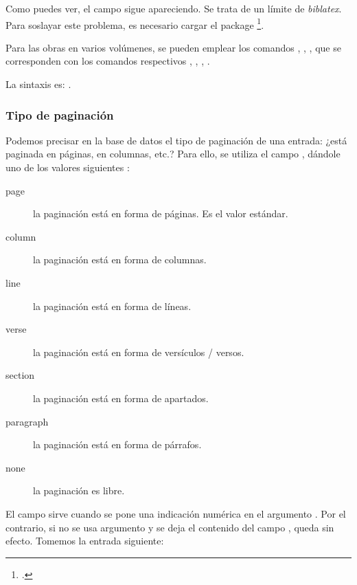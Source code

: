\begin{quotation}
\cite[\pno~24, pasaje muy interesante.]{Junod1992}
\end{quotation}

Como puedes ver, el campo  sigue apareciendo. Se trata de
un límite de \emph{biblatex}. Para soslayar este problema, es
necesario cargar el package
\footcite{biblatex-true-citepages-omit}.






\begin{plusloins}
  Para las obras en varios volúmenes, se pueden emplear los comandos
  , , , 
  que se corresponden con los comandos respectivos , ,
  , .

La sintaxis es: 
.
\end{plusloins}

\subsubsection{Tipo de paginación}

Podemos precisar en la base de datos el tipo de paginación de una
entrada: ¿está paginada en páginas, en columnas, etc.? Para ello, se
utiliza el campo , dándole uno de los valores siguientes :

\begin{description}
\item[page] la paginación está en forma de páginas. Es el valor estándar.
\item[column] la paginación está en forma de columnas.
\item[line] la paginación está en forma de líneas.
\item[verse] la paginación está en forma de versículos / versos.
\item[section] la paginación está en forma de apartados.
\item[paragraph] la paginación está en forma de párrafos.
\item[none] la paginación es libre.
\end{description}

El campo  sirve cuando se pone una indicación
numérica en el argumento . Por el contrario, si no se
usa argumento  y se deja el contenido del campo
, queda sin efecto. Tomemos la entrada siguiente:

